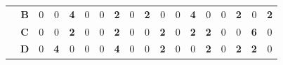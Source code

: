 \documentclass[letterpaper,12pt]{article}
\begin{document}
\begin{table}[h]
\begin{tabular}{|cc|cccccccccccccccc|}
                                                                                                                                                                                                                                                            & \textbf{B} & 0                                      & 0                                              & \textbf{4}                                     & 0                                              & 0                                              & \textbf{2}                                     & 0                                              & \textbf{2}                                     & 0                                              & 0                                              & \textbf{4}                                     & 0                                              & 0                                              & \textbf{2}                                     & 0                                              & \textbf{2}                                      \\
                                                                                                                                                                                                                                                            & \textbf{C} & {\cellcolor[rgb]{0.902,0.902,0.902}}0  & {\cellcolor[rgb]{0.902,0.902,0.902}}0          & {\cellcolor[rgb]{0.902,0.902,0.902}}\textbf{2} & {\cellcolor[rgb]{0.902,0.902,0.902}}0          & {\cellcolor[rgb]{0.902,0.902,0.902}}0          & {\cellcolor[rgb]{0.902,0.902,0.902}}\textbf{2} & {\cellcolor[rgb]{0.902,0.902,0.902}}0          & {\cellcolor[rgb]{0.902,0.902,0.902}}0          & {\cellcolor[rgb]{0.902,0.902,0.902}}\textbf{2} & {\cellcolor[rgb]{0.902,0.902,0.902}}0          & {\cellcolor[rgb]{0.902,0.902,0.902}}\textbf{2} & {\cellcolor[rgb]{0.902,0.902,0.902}}\textbf{2} & {\cellcolor[rgb]{0.902,0.902,0.902}}0          & {\cellcolor[rgb]{0.902,0.902,0.902}}0          & {\cellcolor[rgb]{0.902,0.902,0.902}}\textbf{6} & {\cellcolor[rgb]{0.902,0.902,0.902}}0           \\
                                                                                                                                                                                                                                                            & \textbf{D} & 0                                      & \textbf{4}                                     & 0                                              & 0                                              & 0                                              & \textbf{4}                                     & 0                                              & 0                                              & \textbf{2}                                     & 0                                              & 0                                              & \textbf{2}                                     & 0                                              & \textbf{2}                                     & \textbf{2}                                     & 0                                               \\

\end{tabular}
\end{table}
\end{document}
